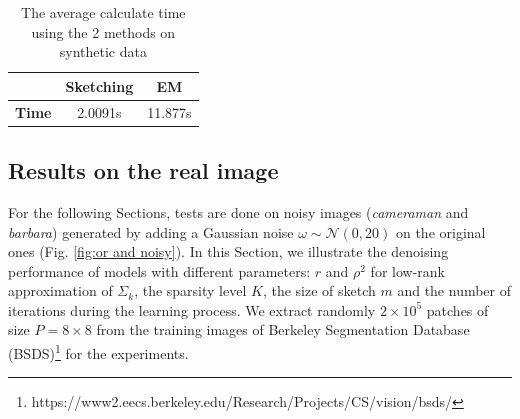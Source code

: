 \documentclass[12pt,a4paper]{article}
\begin{document}
\begin{table}[h]\centering
\begin{tabular}{|c|c|c|}
\hline
 & \bfseries Sketching & \bfseries EM \\
\hline
\bfseries Time  & 2.0091s & 11.877s \\
\hline
\end{tabular}
\caption{The average calculate time using the 2 methods on synthetic data}
\end{table}

\subsection{Results on the real image}\label{Section:res img}
For the following Sections, tests are done on noisy images (\textit{cameraman} and \textit{barbara}) generated by adding a Gaussian noise $\omega \sim \mathcal{N}(0, 20)$ on the original ones (Fig. \ref{fig:or and noisy}).
In this Section, we illustrate the denoising performance of models with different parameters: $r$ and $\rho^2$ for low-rank approximation of $\Sigma_k$, the sparsity level $K$, the size of sketch $m$ and the number of iterations during the learning process.
We extract randomly $2 \times 10^5$ patches of size $P = 8 \times 8$ from the training images of Berkeley Segmentation Database (BSDS)\footnote{https://www2.eecs.berkeley.edu/Research/Projects/CS/vision/bsds/} for the experiments.
\end{document}
